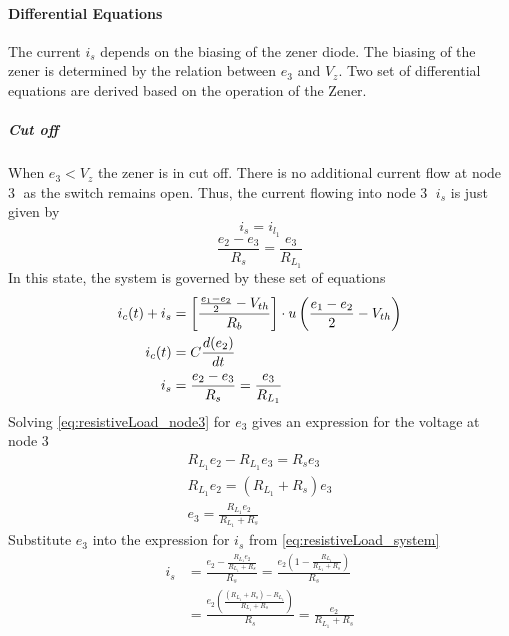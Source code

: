 \paragraph{Differential Equations}
The current $i_s$ depends on the biasing of the zener diode. The biasing of the zener is determined by the relation between $e_3$ and $V_z$. Two set of differential equations are derived based on the operation of the Zener.
\subparagraph{Cut off}
When $e_3 < V_z$ the zener is in cut off. There is no additional current flow at node \textcircled{3} as the switch remains open. Thus, the current flowing into node \textcircled{3} $i_s$ is just given by $$i_s = i_{l_1}$$
\begin{equation}
	\frac{e_2-e_3}{R_s}=\frac{e_3}{R_{L_1}}
	\label{eq:resistiveLoad_node3}
\end{equation}
In this state, the system is governed by these set of equations
\begin{equation}
	\begin{split}
    	i_c(t) + i_s &= \left[\frac{\frac{e_1 - e_2}{2} - V_{th}}{R_b} \right]\cdot u\left(\frac{e_1 - e_2}{2} - V_{th} \right)\\
    	i_c(t)&=C\frac{d(e_2)}{dt}\\
    	i_s&=\frac{e_2-e_3}{R_s}=\frac{e_3}{R_{L_1}}
	\end{split}
	    \label{eq:resistiveLoad_system}
\end{equation}
Solving \eqref{eq:resistiveLoad_node3} for $e_3$ gives an expression for the voltage at node \textcircled{3}
\begin{equation}
	\begin{split}
		R_{L_1}e_2 - R_{L_1}e_3 = R_s e_3 \\
		R_{L_1}e_2 = (R_{L_1} + R_s)e_3 \\
		e_3 = \frac{R_{L_1}e_2}{R_{L_1} + R_s}
	\end{split}
	\label{eq:resistiveLoad_outputVoltage}
\end{equation}
Substitute $e_3$ into the expression for $i_s$ from \eqref{eq:resistiveLoad_system}
\begin{equation}
	\begin{split}
		i_s &= \frac{e_2 - \frac{R_{L_1}e_2}{R_{L_1} + R_s}}{R_s} 
			= \frac{e_2 (1 - \frac{R_{L_1}}{R_{L_1} + R_s})}{R_s} \\
			&= \frac{e_2 (\frac{(R_{L_1} + R_s) - R_{L_1}}{R_{L_1} + R_s})}{R_s} 
			= \frac{e_2}{R_{L_1} + R_s}
	\end{split}
	\label{eq:resistiveLoad_is}
\end{equation}
